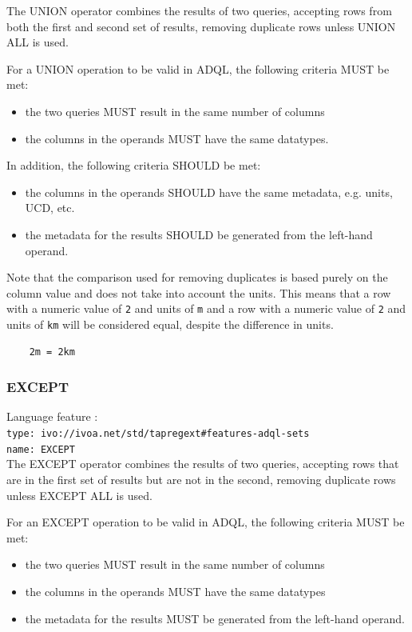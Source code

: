 \documentclass[11pt,a4paper]{ivoa}
\begin{document}
The UNION operator combines the results of two queries, accepting rows from
both the first and second set of results,
removing duplicate rows unless UNION ALL is used.

For a UNION operation to be valid in ADQL, the following criteria MUST be met:
\begin{itemize}
    \item the two queries MUST result in the same number of columns
    \item the columns in the operands MUST have the same datatypes.
\end{itemize}

In addition, the following criteria SHOULD be met: 
\begin{itemize}
    \item the columns in the operands SHOULD have the same metadata, e.g. units, UCD, etc.
    \item the metadata for the results SHOULD be generated from the left-hand operand.
\end{itemize}

Note that the comparison used for removing duplicates is based purely on the
column value and does not take into account the units.
This means that a row with a numeric value of \verb:2: and units of \verb:m:
and a row with a numeric value of \verb:2: and units of \verb:km: will be
considered equal, despite the difference in units.
\begin{verbatim}
    2m = 2km
\end{verbatim}

\subsubsection{EXCEPT}
{\footnotesize Language feature :}\\
{\footnotesize \verb|type: ivo://ivoa.net/std/tapregext#features-adql-sets|}\\
{\footnotesize \verb|name: EXCEPT|}\\

The EXCEPT operator combines the results of two queries, accepting rows that are
in the first set of results but are not in the second,
removing duplicate rows unless EXCEPT ALL is used.

For an EXCEPT operation to be valid in ADQL, the following criteria MUST be met:

\begin{itemize}
    \item the two queries MUST result in the same number of columns
    \item the columns in the operands MUST have the same datatypes
    \item the metadata for the results MUST be generated from the left-hand operand.
\end{itemize}
\end{document}
